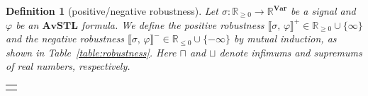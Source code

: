 \documentclass[envcountsect,orivec]{llncs} \usepackage{etex} \usepackage[]{graphicx}
\newtheorem{mydefinition}[mytheorem]{Definition}
\newcommand{\R}{{\mathbb{R}}}
\newcommand{\Var}{\mathbf{Var}}
\newcommand{\UntilOp}[1]{\mathbin{\mathcal{U}_{#1}}}
\newcommand{\Release}[1]{\mathbin{\mathcal{R}_{#1}}}
\newcommand{\Robust}[2]{{ \llbracket #1,\, #2 \rrbracket}}
\newcommand{\Defeq}{\triangleq}
\newcommand{\Vee}[1]{{{\bigsqcup_{#1}}}}
\newcommand{\Wedge}[1]{{{\bigsqcap_{#1}}}}
\newcommand{\AvSTL}{\textbf{AvSTL}}
\newcommand{\Rnn}{\R_{\ge 0}}
\newcommand{\Rnp}{\R_{\le 0}}
\begin{document}
\begin{mydefinition}[positive/negative robustness]\label{def:semantics}
  Let $\sigma \colon \Rnn \to \R^\Var$ be a signal 
  and $\varphi$ be an $\AvSTL$ formula.
  We define the \emph{positive robustness} 
  $\Robust{\sigma}{\varphi}^{+} \in \Rnn \cup \{\infty\}$ 
  and the \emph{negative  robustness} 
  $\Robust{\sigma}{\varphi}^{-} \in \Rnp \cup \{ - \infty\}$ 
  by mutual induction, as shown in Table~\ref{table:robustness}. 
  Here $\sqcap$ and $\sqcup$ denote infimums and supremums of real numbers, respectively.
  \begin{table}[t]
 \begin{tabular}{l}
     \scalebox{0.86}{
      \begin{math}
      \begin{array}{rll}
        \Robust{\sigma}{\top}^{+} & \Defeq & \infty\\
        \Robust{\sigma}{\bot}^{+} & \Defeq & 0\\
        \Robust{\sigma}{x < r}^{+} & \Defeq & 0\sqcup (r - \sigma(0)(x))\\
        \Robust{\sigma}{x \leq r}^{+} & \Defeq & 0\sqcup(r - \sigma(0)(x))\\
        \Robust{\sigma}{x \geq r}^{+} & \Defeq & 0\sqcup(\sigma(0)(x) - r)\\
        \Robust{\sigma}{x > r}^{+} & \Defeq & 0\sqcup( \sigma(0)(x) - r)\\
        \Robust{\sigma}{\neg \varphi}^{+} & \Defeq & - \Robust{\sigma}{\varphi}^{-}\\
        \Robust{\sigma}{\varphi_1 \vee \varphi_2}^{+} & \Defeq & 
        \Robust{\sigma}{\varphi_1}^{+} \sqcup \Robust{\sigma}{\varphi_2}^{+}\\
        \Robust{\sigma}{\varphi_1 \wedge \varphi_2}^{+} & \Defeq & 
        \Robust{\sigma}{\varphi_1}^{+} \sqcap \Robust{\sigma}{\varphi_2}^{+}\\
        \\
      \end{array}
      \quad
      \begin{array}{l}
        \begin{array}{rll}
          \Robust{\sigma}{\varphi_1 \UntilOp{I} \varphi_2}^{+} 
          & \Defeq 
          & \Vee{t \in I} 
            (\Robust{\sigma^t}{\varphi_2}^{+} \sqcap 
            \Wedge{t' \in [0, t)} \Robust{\sigma^{t'}}{\varphi_1}^{+})\\
          \Robust{\sigma}{\varphi_1 \Release{I} \varphi_2}^{+} 
          & \Defeq 
          & \Wedge{t \in I} 

\end{array}
\end{array}
\end{math}}
\end{tabular}
\end{table}
\end{mydefinition}
\end{document}
